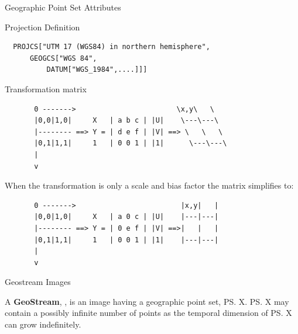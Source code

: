 \documentclass[final,total,bgColor,slideColor,pdf,ps2pdf,default,noaccumulate]{prosper}
\begin{document}
\begin{slide}{Geographic Point Set Attributes}
  \centering
  \begin{Itemize}
  \item Projection Definition \\
    { \fontsize{6}{6}\selectfont
\begin{verbatim}
  PROJCS["UTM 17 (WGS84) in northern hemisphere",
      GEOGCS["WGS 84",
          DATUM["WGS_1984",....]]]
\end{verbatim}
    }
  \item Transformation matrix \\
  { \fontsize{6}{6}\selectfont
\begin{verbatim}
       0 ------->                        \x,y\   \
       |0,0|1,0|     X   | a b c | |U|    \---\---\
       |-------- ==> Y = | d e f | |V| ==> \   \   \
       |0,1|1,1|     1   | 0 0 1 | |1|      \---\---\
       |
       v
\end{verbatim}   
    When the transformation is only a scale and bias factor the matrix
    simplifies to:
\begin{verbatim}
       0 ------->                         |x,y|   |
       |0,0|1,0|     X   | a 0 c | |U|    |---|---|
       |-------- ==> Y = | 0 e f | |V| ==>|   |   |
       |0,1|1,1|     1   | 0 0 1 | |1|    |---|---|
       |
       v
\end{verbatim}
}
\end{Itemize}  
\end{slide}

\begin{slide}{Geostream Images}

  \vspace*{1cm}

  A {\bf GeoStream}, , is an image having a geographic point
  set, \ps{X}.  \ps{X} may contain a possibly infinite number of
  points as the temporal dimension of \ps{X} can grow indefinitely.



\end{slide}
\end{document}

